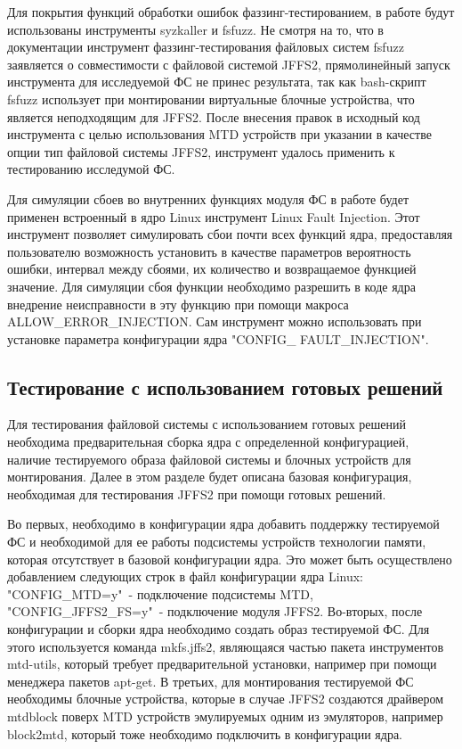 Для покрытия функций обработки ошибок фаззинг-тестированием, в работе будут использованы инструменты syzkaller и fsfuzz. Не смотря на то, что в документации инструмент фаззинг-тестирования файловых систем fsfuzz заявляется о совместимости с файловой системой JFFS2, прямолинейный запуск инструмента для исследуемой ФС не принес результата, так как bash-скрипт fsfuzz использует при монтировании виртуальные блочные устройства, что является неподходящим для JFFS2. После внесения правок в исходный код инструмента с целью использования MTD устройств при указании в качестве опции тип файловой системы JFFS2, инструмент удалось применить к тестированию исследумой ФС.

Для симуляции сбоев во внутренних функциях модуля ФС в работе будет применен встроенный в ядро Linux инструмент Linux Fault Injection. Этот инструмент позволяет симулировать сбои почти всех функций ядра, предоставляя пользователю возможность установить в качестве параметров вероятность ошибки, интервал между сбоями, их количество и возвращаемое функцией значение. Для симуляции сбоя функции необходимо разрешить в коде ядра внедрение неисправности в эту функцию при помощи макроса ALLOW\_ERROR\_INJECTION. Сам инструмент можно использовать при установке параметра конфигурации ядра "CONFIG\_ FAULT\_INJECTION".

\subsection{Тестирование с использованием готовых решений}

Для тестирования файловой системы с использованием готовых решений необходима предварительная сборка ядра с определенной конфигурацией, наличие тестируемого образа файловой системы и блочных устройств для монтирования. Далее в этом разделе будет описана базовая конфигурация, необходимая для тестирования JFFS2 при помощи готовых решений.

Во первых, необходимо в конфигурации ядра добавить поддержку тестируемой ФС и необходимой для ее работы подсистемы устройств технологии памяти, которая отсутствует в базовой конфигурации ядра. Это может быть осуществлено добавлением следующих строк в файл конфигурации ядра Linux: "CONFIG\_MTD=y"\ - подключение подсистемы MTD, "CONFIG\_JFFS2\_FS=y"\ - подключение модуля JFFS2. Во-вторых, после конфигурации и сборки ядра необходимо создать образ тестируемой ФС. Для этого используется команда mkfs.jffs2, являющаяся частью пакета инструментов mtd-utils, который требует предварительной установки, например при помощи менеджера пакетов apt-get. В третьих, для монтирования тестируемой ФС необходимы блочные устройства, которые в случае JFFS2 создаются драйвером mtdblock поверх MTD устройств эмулируемых одним из эмуляторов, например block2mtd, который тоже необходимо подключить в конфигурации ядра.

